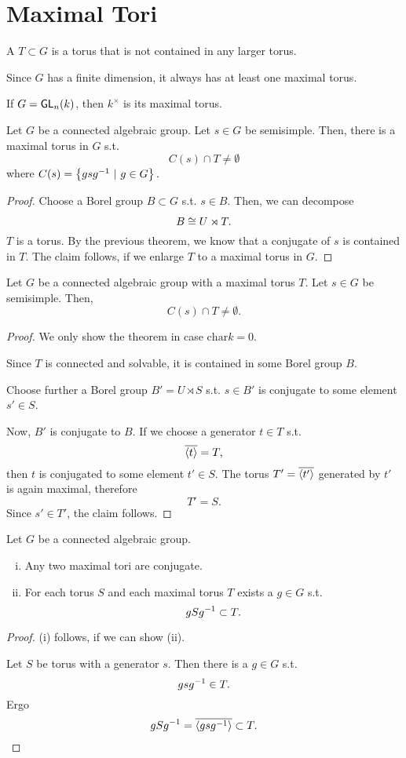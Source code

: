 \section{Maximal Tori}
\begin{definition}
	A  $T \subset G$ is a torus that is not contained in any larger torus.
	
	Since $G$ has a finite dimension, it always has at least one maximal torus.
\end{definition}
\begin{example}
	If $G = \textsf{GL}_n(k)$, then $k^\times$ is its maximal torus.
\end{example}
\begin{lemma}
	Let $G$ be a connected algebraic group. Let $s \in G$ be semisimple. Then, there is a maximal torus in $G$ s.t.
	\[ C(s) \cap T \neq \emptyset \]
	where $C(s) = \left\lbrace gsg^{-1} ~ | ~ g\in G\right\rbrace.$
\end{lemma}
\begin{proof}
	Choose a Borel group $B \subset G$ s.t. $s \in B$. Then, we can decompose
	\[ B \overset{}{\cong} U \rtimes T. \]
	$T$ is a torus. By the previous theorem, we know that a conjugate of $s$ is contained in $T$. The claim follows, if we enlarge $T$ to a maximal torus in $G$.
\end{proof}

\begin{theorem}
	Let $G$ be a connected algebraic group with a maximal torus $T$. Let $s \in G$ be semisimple. Then, 
	\[ C(s) \cap T \neq \emptyset. \]
\end{theorem}
\begin{proof}
	We only show the theorem in case $\mathrm{char} k = 0$.
	
	Since $T$ is connected and solvable, it is contained in some Borel group $B$.
	
	Choose further a Borel group $B' = U \rtimes S$ s.t. $s\in B'$ is conjugate to some element $s' \in S$.
	
	Now, $B'$ is conjugate to $B$. If we choose a generator $t \in T$ s.t.
	\[ \overline{\left<t\right>} = T, \]
	then $t$ is conjugated to some element $t' \in S$. The torus $T' = \overline{\left<t'\right>}$ generated by $t'$ is again maximal, therefore
	\[ T' = S. \]
	Since $s' \in T'$, the claim follows.
\end{proof}

\begin{corollary}
	Let $G$ be a connected algebraic group.
	\begin{enumerate}[(i)]
		\item Any two maximal tori are conjugate.
		\item For each torus $S$ and each maximal torus $T$ exists a $g \in G$ s.t.
		\[ gSg^{-1} \subset T. \]
	\end{enumerate}
\end{corollary}
\begin{proof}
	(i) follows, if we can show (ii).
	
	Let $S$ be torus with a generator $s$. Then there is a $g \in G$ s.t.
	\[ gsg^{-1} \in T. \]
	Ergo
	\[ gSg^{-1} = \overline{\left<gsg^{-1}\right>} \subset T. \]
\end{proof}

